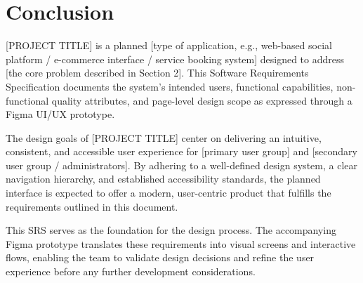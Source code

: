 \documentclass[12pt, a4paper]{article}
\begin{document}
\section{Conclusion}

[PROJECT TITLE] is a planned [type of application, e.g., web-based social platform / e-commerce interface / service booking system] designed to address [the core problem described in Section 2]. This Software Requirements Specification documents the system's intended users, functional capabilities, non-functional quality attributes, and page-level design scope as expressed through a Figma UI/UX prototype.

The design goals of [PROJECT TITLE] center on delivering an intuitive, consistent, and accessible user experience for [primary user group] and [secondary user group / administrators]. By adhering to a well-defined design system, a clear navigation hierarchy, and established accessibility standards, the planned interface is expected to offer a modern, user-centric product that fulfills the requirements outlined in this document.

This SRS serves as the foundation for the design process. The accompanying Figma prototype translates these requirements into visual screens and interactive flows, enabling the team to validate design decisions and refine the user experience before any further development considerations.

\end{document}
